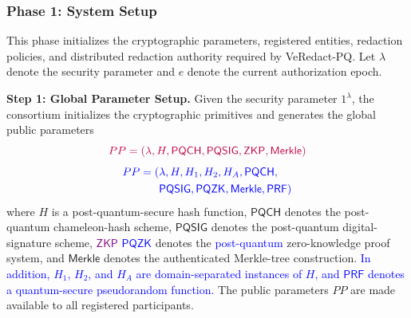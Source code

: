 \documentclass[lettersize,journal]{IEEEtran}
\begin{document}
\subsubsection*{\textbf{Phase 1: System Setup}}

This phase initializes the cryptographic parameters, registered
entities, redaction policies, and distributed redaction authority
required by VeRedact-PQ. Let $\lambda$ denote the security parameter
and $e$ denote the current authorization epoch.

\textbf{Step 1: Global Parameter Setup.}
Given the security parameter $1^\lambda$, the consortium initializes
the cryptographic primitives and generates the global public
parameters
\begin{equation}
{\color{purple}PP={(\lambda,H,\mathsf{PQCH},\mathsf{PQSIG},
\mathsf{ZKP},\mathsf{Merkle})}}
\end{equation}
\begin{equation}
{\color{blue}
\begin{aligned}
PP=(&\lambda,H,H_1,H_2,H_A,\mathsf{PQCH},\\
&\mathsf{PQSIG},\mathsf{PQZK},\mathsf{Merkle},\mathsf{PRF})
\end{aligned}}
\end{equation}
where $H$ is a post-quantum-secure hash function,
$\mathsf{PQCH}$ denotes the post-quantum chameleon-hash scheme,
$\mathsf{PQSIG}$ denotes the post-quantum digital-signature scheme,
\textcolor{purple}{$\mathsf{ZKP}$}\textcolor{blue}{ $\mathsf{PQZK}$} denotes the \textcolor{blue}{post-quantum} zero-knowledge proof system, and
$\mathsf{Merkle}$ denotes the authenticated Merkle-tree construction.
\textcolor{blue}{In addition, $H_1$, $H_2$, and $H_A$ are domain-separated
instances of $H$, and $\mathsf{PRF}$ denotes a quantum-secure
pseudorandom function.}
The public parameters $PP$ are made available to all registered
participants.
\end{document}

